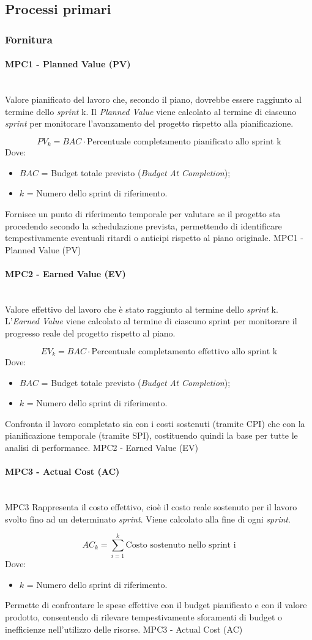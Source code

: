\documentclass[10pt, letterpaper]{article}
\newcommand{\trisubsection}[1]{\paragraph{#1}\mbox{}\\}
\begin{document}
\subsection{Processi primari}

\subsubsection{Fornitura}

\trisubsection{MPC1 - Planned Value (PV)}
\label{sec:MPC1}
{Valore pianificato del lavoro che, secondo il piano,
    dovrebbe essere raggiunto al termine dello \textit{sprint} k.
    Il \textit{Planned Value} viene calcolato al termine di ciascuno \textit{sprint} per monitorare
    l'avanzamento del progetto rispetto alla pianificazione.}
{\[ PV_k = BAC \cdot \mbox{Percentuale completamento pianificato allo sprint k} \] Dove:
    \begin{itemize}
        \item $BAC$ = Budget totale previsto (\textit{Budget At Completion});
        \item $k$ = Numero dello sprint di riferimento.
    \end{itemize}
}
{Fornisce un punto di riferimento temporale per
    valutare se il progetto sta procedendo secondo la schedulazione prevista,
    permettendo di identificare tempestivamente eventuali ritardi o anticipi
    rispetto al piano originale.}
{MPC1 - Planned Value (PV)}

\trisubsection{MPC2 - Earned Value (EV)}
\label{sec:MPC2}
{Valore effettivo del lavoro che è stato raggiunto al termine dello \textit{sprint} k.
    L'\textit{Earned Value} viene calcolato al termine di ciascuno sprint per monitorare il progresso
    reale del progetto rispetto al piano.}
{\[ EV_k = BAC \cdot \mbox{Percentuale completamento effettivo allo sprint k} \] Dove:
    \begin{itemize}
        \item $BAC$ = Budget totale previsto (\textit{Budget At Completion});
        \item $k$ = Numero dello sprint di riferimento.
    \end{itemize}
}
{Confronta il lavoro completato sia con i costi
    sostenuti (tramite CPI) che con la pianificazione temporale
    (tramite SPI), costituendo quindi la base per tutte le analisi di performance.}
{MPC2 - Earned Value (EV)}

\trisubsection{MPC3 - Actual Cost (AC)}
\label{sec:MPC3}
\Metrica
{MPC3}
{Rappresenta il costo effettivo, cioè il costo reale sostenuto per il lavoro svolto
    fino ad un determinato \textit{sprint}. Viene calcolato alla fine di ogni \textit{sprint}.}
{\[ AC_k = \sum_{i=1}^{k} \mbox{Costo sostenuto nello sprint i} \]
    Dove:
    \begin{itemize}
        \item $k$ = Numero dello sprint di riferimento.
    \end{itemize}
}
{Permette di confrontare le spese effettive
    con il budget pianificato e con il valore prodotto, consentendo di rilevare
    tempestivamente sforamenti di budget o inefficienze nell'utilizzo
    delle risorse.}
{MPC3 - Actual Cost (AC)}
\end{document}
